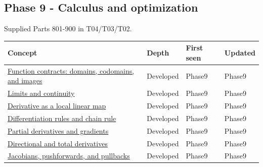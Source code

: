 \subsection{Phase 9 - Calculus and optimization}\label{appendix-a6d556a4ef50-phase-9---calculus-and-optimization}

\hypertarget{appendix-a6d556a4ef50-phase-9---calculus-and-optimization}{}

Supplied Parts 801-900 in T04/T03/T02.

{\def\LTcaptype{none} %
\begin{longtable}[]{@{}
  >{\raggedright\arraybackslash}p{}
  >{\raggedright\arraybackslash}p{}
  >{\raggedright\arraybackslash}p{}
  >{\raggedright\arraybackslash}p{}@{}}
\toprule\noalign{}
\begin{minipage}[b]{\linewidth}\raggedright
Concept
\end{minipage} & \begin{minipage}[b]{\linewidth}\raggedright
Depth
\end{minipage} & \begin{minipage}[b]{\linewidth}\raggedright
First seen
\end{minipage} & \begin{minipage}[b]{\linewidth}\raggedright
Updated
\end{minipage} \\
\midrule\noalign{}
\endhead
\bottomrule\noalign{}
\endlastfoot
\hyperref[appendix-a59658325cd6]{Function contracts: domains, codomains, and images} & Developed & Phase9 & Phase9 \\
\hyperref[appendix-fecc1847f5a3]{Limits and continuity} & Developed & Phase9 & Phase9 \\
\hyperref[appendix-7bc181935c42]{Derivative as a local linear map} & Developed & Phase9 & Phase9 \\
\hyperref[appendix-d9f70bdfbc92]{Differentiation rules and chain rule} & Developed & Phase9 & Phase9 \\
\hyperref[appendix-677b59746ae0]{Partial derivatives and gradients} & Developed & Phase9 & Phase9 \\
\hyperref[appendix-e2d476574aab]{Directional and total derivatives} & Developed & Phase9 & Phase9 \\
\hyperref[appendix-d8a7ddb675eb]{Jacobians, pushforwards, and pullbacks} & Developed & Phase9 & Phase9 \\

\end{longtable}}
